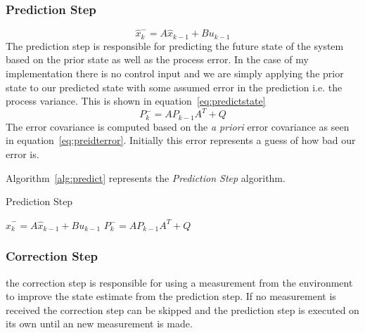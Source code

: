 \documentclass[letter]{IEEEtran}
\begin{document}
\subsubsection{Prediction Step}
\begin{equation}
\label{eq:predictstate}
\hat{x}_k^- = A\hat{x}_{k-1} + Bu_{k-1}
\end{equation}
The prediction step is responsible for predicting the future state of the system based on the prior state as well as the process error. In the case of my implementation there is no control input and we are simply applying the prior state to our predicted state with some assumed error in the prediction i.e. the process variance. This is shown in equation~\ref{eq:predictstate}
\begin{equation}
\label{eq:preidterror}
P_k^- = AP_{k-1}A^T + Q
\end{equation}
The error covariance is computed based on the \emph{a priori} error covariance as seen in equation~\ref{eq:preidterror}. Initially this error represents a guess of how bad our error is.

Algorithm~\ref{alg:predict} represents the \emph{Prediction Step} algorithm.
\begin{algorithm}
\caption{Prediction Step}
\label{alg:predict}
\begin{algorithmic}[1]
\STATE $\hat{x}_k^- = A\hat{x}_{k-1} + Bu_{k-1}$
\STATE $P_k^- = AP_{k-1}A^T + Q$
\end{algorithmic}
\end{algorithm}

\subsubsection{Correction Step}
the correction step is responsible for using a measurement from the environment to improve the state estimate from the prediction step. If no measurement is received the correction step can be skipped and  the prediction step is executed on its own until an new measurement is made.
\end{document}
